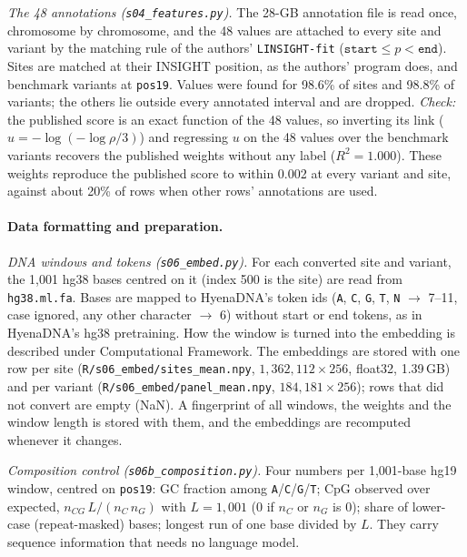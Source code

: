 \documentclass[11pt]{article}
\newcommand{\file}[1]{\nolinkurl{#1}}
\begin{document}
\emph{The 48 annotations (\file{s04_features.py}).} The 28-GB annotation file is read once, chromosome by
chromosome, and the 48 values are attached to every site and variant by the matching rule of the authors'
\file{LINSIGHT-fit} ($\texttt{start}\le p<\texttt{end}$). Sites are matched at their INSIGHT position, as
the authors' program does, and benchmark variants at \texttt{pos19}. Values were found for 98.6\% of sites
and 98.8\% of variants; the others lie outside every annotated interval and are dropped.
\emph{Check:} the published score is an exact function of the 48 values, so inverting its link
($u=-\log(-\log\rho/3)$) and regressing $u$ on the 48 values over the benchmark variants recovers the
published weights without any label ($R^2=1.000$). These weights reproduce the published score to within
0.002 at every variant and site, against about 20\% of rows when other rows' annotations are used.

\paragraph{Data formatting and preparation.}
\emph{DNA windows and tokens (\file{s06_embed.py}).} For each converted site and variant, the 1,001 hg38
bases centred on it (index 500 is the site) are read from \file{hg38.ml.fa}. Bases are mapped to HyenaDNA's
token ids (\texttt{A}, \texttt{C}, \texttt{G}, \texttt{T}, \texttt{N} $\to$ 7--11, case ignored, any other
character $\to$ 6) without start or end tokens, as in HyenaDNA's hg38 pretraining. How the window is turned
into the embedding is described under Computational Framework. The embeddings are stored with one row per
site (\file{R/s06_embed/sites_mean.npy}, $1{,}362{,}112\times256$, float32, 1.39\,GB) and per variant
(\file{R/s06_embed/panel_mean.npy}, $184{,}181\times256$); rows that did not convert are empty (NaN). A
fingerprint of all windows, the weights and the window length is stored with them, and the embeddings are
recomputed whenever it changes.

\emph{Composition control (\file{s06b_composition.py}).} Four numbers per 1,001-base hg19 window, centred on
\texttt{pos19}: GC fraction among \texttt{A}/\texttt{C}/\texttt{G}/\texttt{T}; CpG observed over expected,
$n_{CG}\,L/(n_C\,n_G)$ with $L=1{,}001$ (0 if $n_C$ or $n_G$ is 0); share of lower-case (repeat-masked)
bases; longest run of one base divided by $L$. They carry sequence information that needs no language
model.
\end{document}
